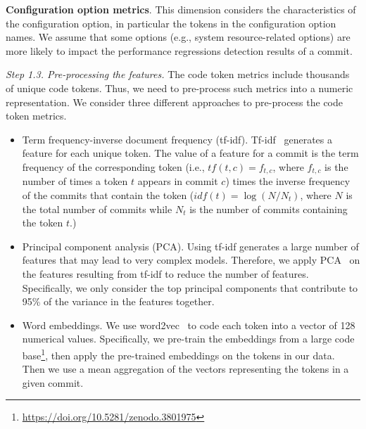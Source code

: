     \textbf{Configuration option metrics}. This dimension considers the characteristics of the configuration option, in particular the tokens in the configuration option names. We assume that some options (e.g., system resource-related options) are more likely to impact the performance regressions detection results of a commit.


\textit{Step 1.3. Pre-processing the features.}
The code token metrics include thousands of unique code tokens. Thus, we need to pre-process such metrics into a numeric representation. We consider three different approaches to pre-process the code token metrics. 
\begin{itemize}
    \item Term frequency-inverse document frequency (tf-idf). Tf-idf~\cite{ramos2003using} generates a feature for each unique token. The value of a feature for a commit is the term frequency of the corresponding token (i.e., $tf(t,c) = f_{t,c}$, where $f_{t,c}$ is the number of times a token $t$ appears in commit $c$) times the inverse frequency of the commits that contain the token ($idf(t) = \log{(N/N_t)}$, where $N$ is the total number of commits while $N_t$ is the number of commits containing the token $t$.) %
    
    \item Principal component analysis (PCA). Using tf-idf generates a large %
    number of features that may lead to very complex models. Therefore, we apply PCA~\cite{wold1987principal} on the features resulting from tf-idf to reduce the number of features. Specifically, we only consider the top principal components that contribute to 95\% of the variance in the features together.
    
    \item Word embeddings. We use word2vec~\cite{Mikolov:2013:DRW:2999792.2999959,Mikolov2013} to code each token into a vector of 128 numerical values. Specifically, we pre-train the embeddings from a large code base\footnote{\url{https://doi.org/10.5281/zenodo.3801975}}, %
    then apply the pre-trained embeddings on the tokens in our data. Then we use a mean aggregation of the vectors representing the tokens in a given commit.
    
    
    
\end{itemize}

